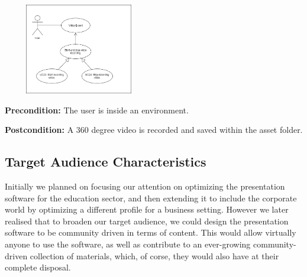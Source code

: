 \documentclass{article}
\begin{document}
\begin{flushleft}
	\begin{center}
	\includegraphics[width=250px,height=150px]{VideoExport.png}
	\end{center}

	\textbf{Precondition:} The user is inside an environment.

	\textbf{Postcondition:} A 360 degree video is recorded and saved within the asset folder.
	\end{flushleft}

\subsection{Target Audience Characteristics}

	Initially we planned on focusing our attention on optimizing the presentation software for the education sector, and then extending it to include the corporate world by optimizing a different profile for a business setting.  However we later realised that to broaden our target audience, we could design the presentation software to be community driven in terms of content.  This would allow virtually anyone to use the software, as well as contribute to an ever-growing community-driven collection of materials, which, of corse, they would also have at their complete disposal.
\end{document}

